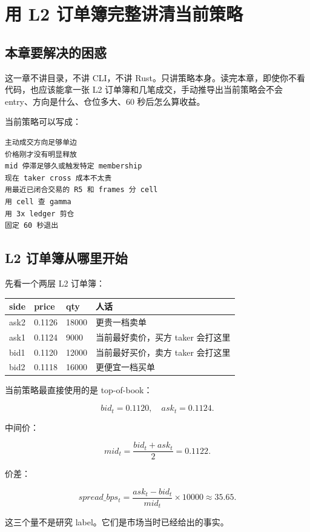 \chapter{用 L2 订单簿完整讲清当前策略}

\section{本章要解决的困惑}

这一章不讲目录，不讲 CLI，不讲 Rust。只讲策略本身。读完本章，即使你不看代码，也应该能拿一张 L2 订单簿和几笔成交，手动推导出当前策略会不会 entry、方向是什么、仓位多大、60 秒后怎么算收益。

当前策略可以写成：

\begin{lstlisting}
主动成交方向足够单边
价格刚才没有明显释放
mid 停滞足够久或触发特定 membership
现在 taker cross 成本不太贵
用最近已闭合交易的 R5 和 frames 分 cell
用 cell 查 gamma
用 3x ledger 剪仓
固定 60 秒退出
\end{lstlisting}

\section{L2 订单簿从哪里开始}

先看一个两层 L2 订单簿：

\begin{longtable}{p{}p{}p{}p{}}
\toprule
side & price & qty & 人话 \\
\midrule
ask2 & 0.1126 & 18000 & 更贵一档卖单 \\
ask1 & 0.1124 & 9000 & 当前最好卖价，买方 taker 会打这里 \\
bid1 & 0.1120 & 12000 & 当前最好买价，卖方 taker 会打这里 \\
bid2 & 0.1118 & 16000 & 更便宜一档买单 \\
\bottomrule
\end{longtable}

当前策略最直接使用的是 top-of-book：

\[
bid_t = 0.1120,\quad ask_t = 0.1124.
\]

中间价：

\[
mid_t=\frac{bid_t+ask_t}{2}=0.1122.
\]

价差：

\[
spread\_bps_t
=\frac{ask_t-bid_t}{mid_t}\times10000
\approx35.65.
\]

这三个量不是研究 label。它们是市场当时已经给出的事实。

